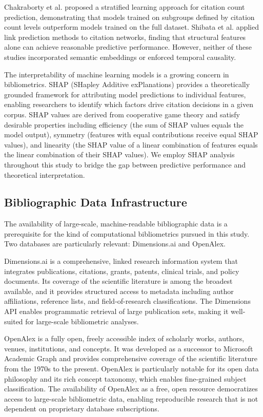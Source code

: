 \documentclass[12pt,a4paper]{article}
\begin{document}
Chakraborty et al. \citep{chakraborty2015towards} proposed a stratified learning approach for citation count prediction, demonstrating that models trained on subgroups defined by citation count levels outperform models trained on the full dataset. Shibata et al. \citep{shibata2012link} applied link prediction methods to citation networks, finding that structural features alone can achieve reasonable predictive performance. However, neither of these studies incorporated semantic embeddings or enforced temporal causality.

The interpretability of machine learning models is a growing concern in bibliometrics. SHAP (SHapley Additive exPlanations) \citep{lundberg2017unified} provides a theoretically grounded framework for attributing model predictions to individual features, enabling researchers to identify which factors drive citation decisions in a given corpus. SHAP values are derived from cooperative game theory and satisfy desirable properties including efficiency (the sum of SHAP values equals the model output), symmetry (features with equal contributions receive equal SHAP values), and linearity (the SHAP value of a linear combination of features equals the linear combination of their SHAP values). We employ SHAP analysis throughout this study to bridge the gap between predictive performance and theoretical interpretation.

\subsection{Bibliographic Data Infrastructure}

The availability of large-scale, machine-readable bibliographic data is a prerequisite for the kind of computational bibliometrics pursued in this study. Two databases are particularly relevant: Dimensions.ai and OpenAlex.

Dimensions.ai \citep{herzog2020dimensions} is a comprehensive, linked research information system that integrates publications, citations, grants, patents, clinical trials, and policy documents. Its coverage of the scientific literature is among the broadest available, and it provides structured access to metadata including author affiliations, reference lists, and field-of-research classifications. The Dimensions API enables programmatic retrieval of large publication sets, making it well-suited for large-scale bibliometric analyses.

OpenAlex \citep{priem2022openalex} is a fully open, freely accessible index of scholarly works, authors, venues, institutions, and concepts. It was developed as a successor to Microsoft Academic Graph and provides comprehensive coverage of the scientific literature from the 1970s to the present. OpenAlex is particularly notable for its open data philosophy and its rich concept taxonomy, which enables fine-grained subject classification. The availability of OpenAlex as a free, open resource democratizes access to large-scale bibliometric data, enabling reproducible research that is not dependent on proprietary database subscriptions.
\end{document}
